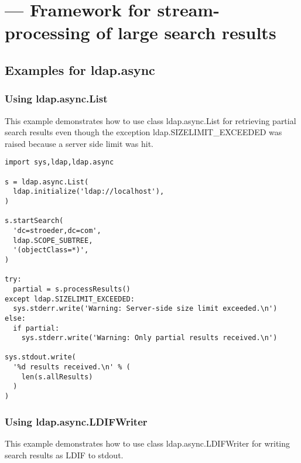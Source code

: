 
\section{ ---
  Framework for stream-processing of large search results }




\subsection{Examples for ldap.async \label{ldap.async-example}}

\subsubsection{Using ldap.async.List \label{ldap.async-example.List}}

This example demonstrates how to use class ldap.async.List for
retrieving partial search results even though the exception
ldap.SIZELIMIT_EXCEEDED was raised because a server side limit was hit.

\begin{verbatim}
import sys,ldap,ldap.async

s = ldap.async.List(
  ldap.initialize('ldap://localhost'),
)

s.startSearch(
  'dc=stroeder,dc=com',
  ldap.SCOPE_SUBTREE,
  '(objectClass=*)',
)

try:
  partial = s.processResults()
except ldap.SIZELIMIT_EXCEEDED:
  sys.stderr.write('Warning: Server-side size limit exceeded.\n')
else:
  if partial:
    sys.stderr.write('Warning: Only partial results received.\n')

sys.stdout.write(
  '%d results received.\n' % (
    len(s.allResults)
  )
)
\end{verbatim}

\subsubsection{Using ldap.async.LDIFWriter \label{ldap.async-example.LDIFWriter}}

This example demonstrates how to use class ldap.async.LDIFWriter
for writing search results as LDIF to stdout.

